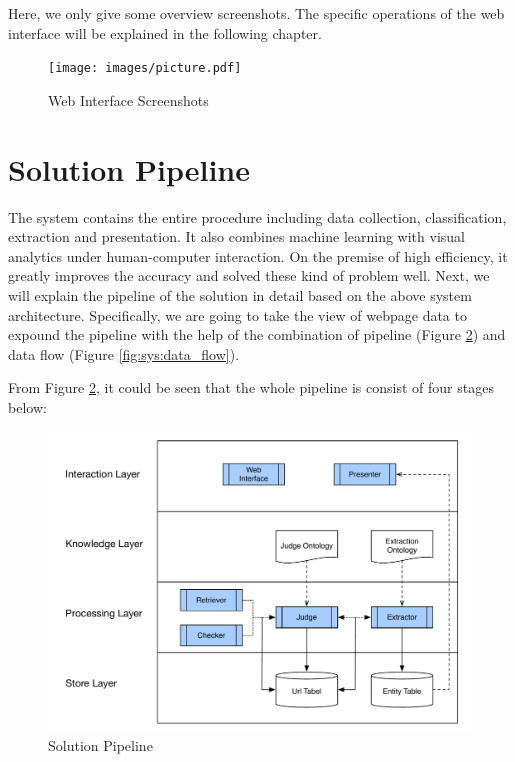 Here, we only give some overview screenshots. The specific operations of the web interface will be explained in the following chapter.

\begin{figure}[htb]
	\centering
	\texttt{[image: images/picture.pdf]}
	\caption{Web Interface Screenshots}\label{fig:sys:webui}
\end{figure}


\section{Solution Pipeline}
The system contains the entire procedure including data collection, classification, extraction and presentation. It also combines machine learning with visual analytics under human-computer interaction. On the premise of high efficiency, it greatly improves the accuracy and solved these kind of problem well. Next, we will explain the pipeline of the solution in detail based on the above system architecture. Specifically, we are going to take the view of webpage data to expound the pipeline with the help of the combination of pipeline (Figure \ref{fig:sys:pip}) and data flow (Figure \ref{fig:sys:data_flow}).

From Figure \ref{fig:sys:pip}, it could be seen that the whole pipeline is consist of four stages below:
\begin{figure}[htb]
	\centering
	\includegraphics[page=2,width=\textwidth]{images/diagrams.pdf}
	\caption{Solution Pipeline}\label{fig:sys:pip}
\end{figure}

